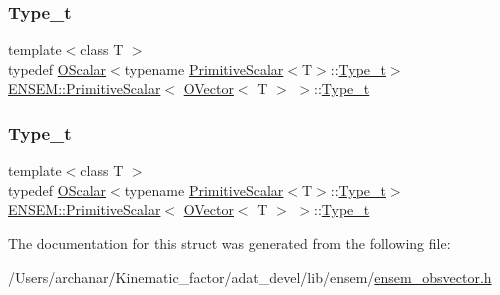\subsubsection{\texorpdfstring{Type\_t}{Type\_t}\hspace{0.1cm}{\footnotesize\ttfamily [1/2]}}
{\footnotesize\ttfamily template$<$class T $>$ \\
typedef \mbox{\hyperlink{classENSEM_1_1OScalar}{O\+Scalar}}$<$typename \mbox{\hyperlink{structENSEM_1_1PrimitiveScalar}{Primitive\+Scalar}}$<$T$>$\+::\mbox{\hyperlink{structENSEM_1_1PrimitiveScalar_3_01OVector_3_01T_01_4_01_4_adf4731d74a76b08e5cc003ad658050b0}{Type\+\_\+t}}$>$ \mbox{\hyperlink{structENSEM_1_1PrimitiveScalar}{E\+N\+S\+E\+M\+::\+Primitive\+Scalar}}$<$ \mbox{\hyperlink{classENSEM_1_1OVector}{O\+Vector}}$<$ T $>$ $>$\+::\mbox{\hyperlink{structENSEM_1_1PrimitiveScalar_3_01OVector_3_01T_01_4_01_4_adf4731d74a76b08e5cc003ad658050b0}{Type\+\_\+t}}}

\mbox{\label{structENSEM_1_1PrimitiveScalar_3_01OVector_3_01T_01_4_01_4_adf4731d74a76b08e5cc003ad658050b0}} 
\subsubsection{\texorpdfstring{Type\_t}{Type\_t}\hspace{0.1cm}{\footnotesize\ttfamily [2/2]}}
{\footnotesize\ttfamily template$<$class T $>$ \\
typedef \mbox{\hyperlink{classENSEM_1_1OScalar}{O\+Scalar}}$<$typename \mbox{\hyperlink{structENSEM_1_1PrimitiveScalar}{Primitive\+Scalar}}$<$T$>$\+::\mbox{\hyperlink{structENSEM_1_1PrimitiveScalar_3_01OVector_3_01T_01_4_01_4_adf4731d74a76b08e5cc003ad658050b0}{Type\+\_\+t}}$>$ \mbox{\hyperlink{structENSEM_1_1PrimitiveScalar}{E\+N\+S\+E\+M\+::\+Primitive\+Scalar}}$<$ \mbox{\hyperlink{classENSEM_1_1OVector}{O\+Vector}}$<$ T $>$ $>$\+::\mbox{\hyperlink{structENSEM_1_1PrimitiveScalar_3_01OVector_3_01T_01_4_01_4_adf4731d74a76b08e5cc003ad658050b0}{Type\+\_\+t}}}



The documentation for this struct was generated from the following file\+:\begin{DoxyCompactItemize}
\item 
/\+Users/archanar/\+Kinematic\+\_\+factor/adat\+\_\+devel/lib/ensem/\mbox{\hyperlink{lib_2ensem_2ensem__obsvector_8h}{ensem\+\_\+obsvector.\+h}}\end{DoxyCompactItemize}
